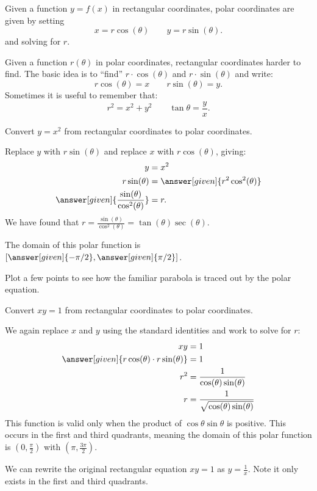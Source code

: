 \documentclass{ximera}
\begin{document}
Given a function $y=f(x)$ in rectangular coordinates, polar coordinates
are given by setting
\[
x=r\cos(\theta)\qquad y=r\sin(\theta).
\]
and solving for $r$.

Given a function $r(\theta)$ in polar coordinates, rectangular
coordinates harder to find. The basic idea is to ``find'' $r\cdot
\cos(\theta)$ and $r\cdot \sin(\theta)$ and write:
\[
r\cos(\theta) = x\qquad r\sin(\theta) = y.
\]
Sometimes it is useful to remember that:
\[
r^2=x^2+y^2\qquad \tan \theta = \frac yx.
\]


\begin{example}
  Convert $y=x^2$ from rectangular coordinates to polar coordinates.
  \begin{explanation}
    Replace $y$ with $r\sin(\theta)$ and replace $x$ with $r\cos(\theta)$, giving:
      \begin{align*}
	y &=x^2\\
	r\sin(\theta) &= \answer[given]{r^2\cos^2(\theta)}\\
	\answer[given]{\frac{\sin(\theta)}{\cos^2(\theta)}}  &= r.
      \end{align*}
      We have found that $r=\frac{\sin(\theta)}{\cos^2(\theta)} = \tan(\theta)\sec(\theta)$. 

      The domain of this polar function is $\left[ \answer[given]{-\pi/2},\answer[given]{\pi/2} \right]$. 

      Plot a few
      points to see how the familiar parabola is traced out by the
      polar equation.
  \end{explanation}
\end{example}

\begin{example}
  Convert $xy = 1$ from rectangular coordinates to polar coordinates.
  \begin{explanation}
    We again replace $x$ and $y$ using the standard identities and
    work to solve for $r$:
    \begin{align*}
	xy &= 1 \\
	\answer[given]{r\cos(\theta)\cdot r\sin(\theta)} & = 1\\
	r^2 & = \frac{1}{\cos(\theta)\sin(\theta)}\\
	r & = \frac{1}{\sqrt{\cos(\theta)\sin(\theta)}}\\
    \end{align*}
    This function is valid only when the product of
    $\cos\theta\sin\theta$ is positive. This occurs in the first and
    third quadrants, meaning the domain of this polar function is
    $(0,\tfrac{\pi}{2})$ with $(\pi,\tfrac{3\pi}{2})$.
      
    We can rewrite the original rectangular equation $xy=1$ as
    $y=\frac{1}{x}$. Note it only exists in the first and third quadrants.
  \end{explanation}
\end{example}
\end{document}
